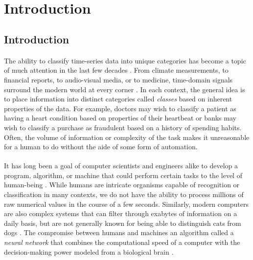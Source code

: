\documentclass[12pt,letterpaper]{article}
\begin{document}
\newpage
\section{Introduction}
\label{sec-Introduction}


\subsection{Introduction}

\paragraph*{}The ability to classify time-series data into unique categories has become a topic of much attention in the last few decades \cite{Khan,Mierswa}. From climate measurements, to financial reports, to audio-visual media, or to medicine, time-domain signals surround the modern world at every corner \cite{Virtanen}. In each context, the general idea is to place information into distinct categories called \textit{classes} based on inherent properties of the data. For example, doctors may wish to classify a patient as having a heart condition based on properties of their heartbeat or banks may wish to classify a purchase as fraudulent based on a history of spending habits. Often, the volume  of information or complexity of the task makes it unreasonable for a human to do without the aide of some form of automation.

\paragraph*{}It has long been a goal of computer scientists and engineers alike to develop a program, algorithm, or machine that could perform certain tasks to the level of human-being \cite{Bishop,Geron,Loy}. While humans are intricate organisms capable of recognition or classification in many contexts, we do not have the ability to process millions of raw numerical values in the course of a few seconds. Similarly, modern computers are also complex systems that can filter through exabytes of information on a daily basis, but are not generally known for being able to distinguish cats from dogs \cite{Geron}. The compromise between humans and machines an algorithm called a \textit{neural network} that combines the computational speed of a computer with the decision-making power modeled from a biological brain \cite{Goodfellow,Levine,Loy}.
\end{document}

